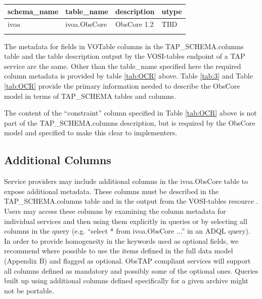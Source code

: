 \documentclass[11pt,a4paper]{ivoa}
\begin{document}
\begin{tabularx}{\textwidth}{|p{}|p{}|p{}|p{}|}
\hline
schema\_name & table\_name & description & utype\\\hline
ivoa & ivoa.ObsCore & ObsCore 1.2 & TBD \\\hline
\caption{TAP\_SCHEMA.tables metadata}
\label{tab:3}
\end{tabularx}

The metadata for fields in VOTable columns in the TAP\_SCHEMA.columns table and the table description output
by the VOSI-tables endpoint of a TAP service are the same. Other than the table\_name specified here the required
column metadata is provided by table \ref{tab:OCR} above. Table \ref{tab:3} and Table \ref{tab:OCR} provide the
primary information needed to describe the ObsCore model in terms of TAP\_SCHEMA tables and columns.

The content of the ``constraint'' column specified in Table \ref{tab:OCR} above is not part of the 
TAP\_SCHEMA.columns description, but is required by the ObsCore model and specified to make this clear to implementers.

\subsection{Additional Columns}
\label{bkm:Ref421295535}\label{bkm:Ref421297012}Service providers may include additional columns in the ivoa.ObsCore
table to expose additional metadata. These columns must be described in the TAP\_SCHEMA.columns table and in the output
from the VOSI-tables resource \citep{2011ivoa.spec.0531G}. Users may access these columns by examining the column
metadata for individual services and then using them explicitly in queries or by selecting all columns in the query
(e.g. ``select * from ivoa.ObsCore ...'' in an ADQL query).  In order to provide homogeneity in the keywords used as
optional fields, we recommend where possible to use the items defined in the full data model (Appendix B) and flagged
as optional. ObsTAP compliant services will support all columns defined as mandatory and possibly some of the optional
ones. Queries built up using additional columns defined specifically for a given archive might not be portable.
\end{document}
